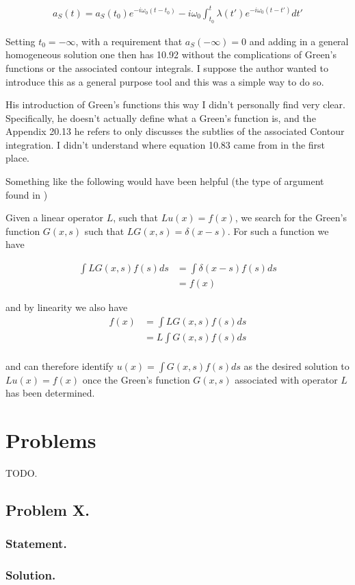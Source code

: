\begin{align}\label{eqn:desaiCh10:5}
a_S(t) = a_S(t_0) e^{-i \omega_0 (t - t_0)} - i \omega_0 \int_{t_0}^t \lambda(t') e^{-i \omega_0 (t-t')} dt'
\end{align}

Setting $t_0 = -\infty$, with a requirement that $a_S(-\infty) = 0$ and adding in a general homogeneous solution one then has 10.92 without the complications of Green's functions or the associated contour integrals.  I suppose the author wanted to introduce this as a general purpose tool and this was a simple way to do so.

His introduction of Green's functions this way I didn't personally find very clear.  Specifically, he doesn't actually define what a Green's function is, and the Appendix 20.13 he refers to only discusses the subtlies of the associated Contour integration.  I didn't understand where equation 10.83 came from in the first place.

Something like the following would have been helpful (the type of argument found in \cite{wiki:greens})

Given a linear operator $L$, such that $L u(x) = f(x)$, we search for the Green's function $G(x,s)$ such that $L G(x,s) = \delta(x-s)$.  For such a function we have

\begin{align*}
\int L G(x,s) f(s) ds 
&= \int \delta(x-s) f(s) ds \\
&= f(x)
\end{align*}

and by linearity we also have
\begin{align*}
f(x) 
&=
\int L G(x,s) f(s) ds \\
&= L \int G(x,s) f(s) ds \\
\end{align*}

and can therefore identify $u(x) = \int G(x,s) f(s) ds$ as the desired solution to $L u(x) = f(x)$ once the Green's function $G(x,s)$ associated with operator $L$ has been determined.

\section{Problems}
TODO.
\subsection{Problem X.}
\subsubsection{Statement.}
\subsubsection{Solution.}

\EndArticle
